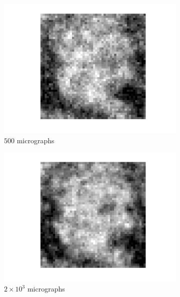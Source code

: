 \documentclass[9pt,twocolumn,twoside,lineno]{pnas-new}
\begin{document}
\begin{figure}[h]
	\centering
	\begin{subfigure}[h]{0.24\textwidth}
		\centering
		\includegraphics[scale=0.35]{Einstien_progress_1}
		\caption{$500$ micrographs }
	\end{subfigure} 
	\begin{subfigure}[h]{0.24\textwidth}
		\centering
		\includegraphics[scale=0.35]{Einstien_progress_4}
		\caption{$2\times 10^3$ micrographs}
	\end{subfigure} 
	\begin{subfigure}[h]{0.24\textwidth}
		\centering

\end{subfigure}
\end{figure}
\end{document}
